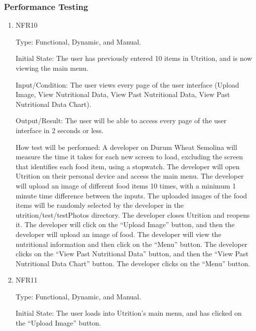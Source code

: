 \documentclass[12pt, titlepage]{article}
\begin{document}
	\subsubsection{Performance Testing}
	
	
	\begin{enumerate}
		
		\item{NFR10\\} 
		
		Type: Functional, Dynamic, and Manual.
		
		Initial State: The user has previously entered 10 items in Utrition, and is now viewing the main menu.
		
		Input/Condition: The user views every page of the user interface (Upload Image, View Nutritional Data, View Past Nutritional Data, View Past Nutritional Data Chart).
		
		Output/Result: The user will be able to access every page of the user interface in 2 seconds or less.
		
		How test will be performed: A developer on Durum Wheat Semolina will measure the time it takes for each new screen to load, excluding the screen that identifies each food item, using a stopwatch. The developer will open Utrition on their personal device and access the main menu. The developer will upload an image of different food items 10 times, with a minimum 1 minute time difference between the inputs. The uploaded images of the food items will be randomly selected by the developer in the utrition/test/testPhotos directory. The developer closes Utrition and reopens it. The developer will click on the “Upload Image” button, and then the developer will upload an image of food. The developer will view the nutritional information and then click on the “Menu” button. The developer clicks on the “View Past Nutritional Data'' button, and then the “View Past Nutritional Data Chart” button. The developer clicks on the “Menu” button.
		
		\item{NFR11\\} 
		
		Type: Functional, Dynamic, and Manual.
		
		Initial State: The user loads into Utrition’s main menu, and has clicked on the “Upload Image” button.
		

\end{enumerate}
\end{document}

